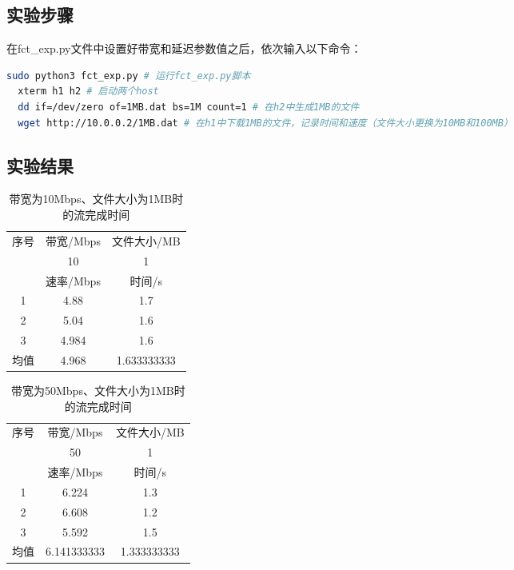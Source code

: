 \documentclass[UTF8]{article}
\begin{document}
\subsection{实验步骤}

在fct_exp.py文件中设置好带宽和延迟参数值之后，依次输入以下命令：

\begin{lstlisting}[language=bash]
  sudo python3 fct_exp.py # 运行fct_exp.py脚本
  xterm h1 h2 # 启动两个host
  dd if=/dev/zero of=1MB.dat bs=1M count=1 # 在h2中生成1MB的文件
  wget http://10.0.0.2/1MB.dat # 在h1中下载1MB的文件，记录时间和速度（文件大小更换为10MB和100MB）
\end{lstlisting}

\subsection{实验结果}

\begin{table}[H]
  \centering
  \caption{带宽为10Mbps、文件大小为1MB时的流完成时间}
  \begin{tabular}{|c|c|c|}
    \hline
    \multirow{3}{*}{序号}&带宽/Mbps&文件大小/MB\\
    \cline{2-3}
    &10&1\\
    \cline{2-3}
    &速率/Mbps&时间/s\\
    \hline
    1&4.88&1.7\\
    \hline
    2&5.04&1.6\\
    \hline
    3&4.984&1.6\\
    \hline
    均值&4.968&1.633333333\\
    \hline
  \end{tabular}
\end{table}

\begin{table}[H]
  \centering
  \caption{带宽为50Mbps、文件大小为1MB时的流完成时间}
  \begin{tabular}{|c|c|c|}
    \hline
    \multirow{3}{*}{序号}&带宽/Mbps&文件大小/MB\\
    \cline{2-3}
    &50&1\\
    \cline{2-3}
    &速率/Mbps&时间/s\\
    \hline
    1&6.224&1.3\\
    \hline
    2&6.608&1.2\\
    \hline
    3&5.592&1.5\\
    \hline
    均值&6.141333333&1.333333333\\
    \hline
  \end{tabular}
\end{table}
\end{document}
